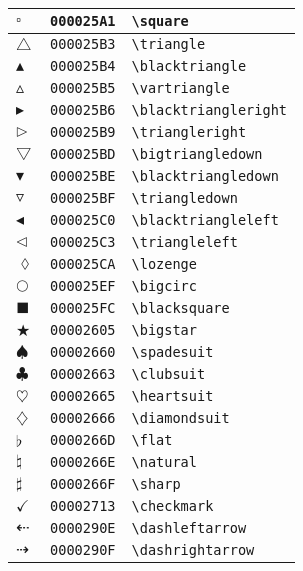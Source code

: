 \begin{longtable}{|l|l|l|}
\hline
$\square$ & \texttt{000025A1} & \verb|\square| \\
\hline
$\triangle$ & \texttt{000025B3} & \verb|\triangle| \\
\hline
$\blacktriangle$ & \texttt{000025B4} & \verb|\blacktriangle| \\
\hline
$\vartriangle$ & \texttt{000025B5} & \verb|\vartriangle| \\
\hline
$\blacktriangleright$ & \texttt{000025B6} & \verb|\blacktriangleright| \\
\hline
$\triangleright$ & \texttt{000025B9} & \verb|\triangleright| \\
\hline
$\bigtriangledown$ & \texttt{000025BD} & \verb|\bigtriangledown| \\
\hline
$\blacktriangledown$ & \texttt{000025BE} & \verb|\blacktriangledown| \\
\hline
$\triangledown$ & \texttt{000025BF} & \verb|\triangledown| \\
\hline
$\blacktriangleleft$ & \texttt{000025C0} & \verb|\blacktriangleleft| \\
\hline
$\triangleleft$ & \texttt{000025C3} & \verb|\triangleleft| \\
\hline
$\lozenge$ & \texttt{000025CA} & \verb|\lozenge| \\
\hline
$\bigcirc$ & \texttt{000025EF} & \verb|\bigcirc| \\
\hline
$\blacksquare$ & \texttt{000025FC} & \verb|\blacksquare| \\
\hline
$\bigstar$ & \texttt{00002605} & \verb|\bigstar| \\
\hline
$\spadesuit$ & \texttt{00002660} & \verb|\spadesuit| \\
\hline
$\clubsuit$ & \texttt{00002663} & \verb|\clubsuit| \\
\hline
$\heartsuit$ & \texttt{00002665} & \verb|\heartsuit| \\
\hline
$\diamondsuit$ & \texttt{00002666} & \verb|\diamondsuit| \\
\hline
$\flat$ & \texttt{0000266D} & \verb|\flat| \\
\hline
$\natural$ & \texttt{0000266E} & \verb|\natural| \\
\hline
$\sharp$ & \texttt{0000266F} & \verb|\sharp| \\
\hline
$\checkmark$ & \texttt{00002713} & \verb|\checkmark| \\
\hline
$\dashleftarrow$ & \texttt{0000290E} & \verb|\dashleftarrow| \\
\hline
$\dashrightarrow$ & \texttt{0000290F} & \verb|\dashrightarrow| \\

\end{longtable}
